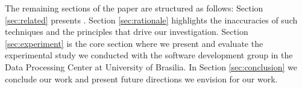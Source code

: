 
The remaining sections of the paper are structured as follows: Section \ref{sec:related} presents . Section \ref{sec:rationale} highlights the inaccuracies of such techniques and the principles that drive our investigation. Section \ref{sec:experiment} is the core section where we present and evaluate the experimental study we conducted with the software development group in the Data Processing Center at University of Brasilia. In Section \ref{sec:conclusion} we conclude our work and present future directions we envision for our work.

